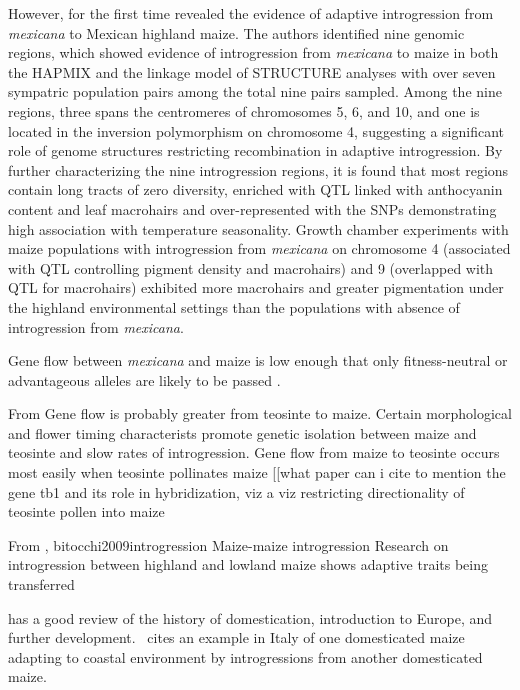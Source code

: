 \documentclass[11pt]{article}
\begin{document}
However, \cite{hufford2013} for the first time revealed the evidence of adaptive introgression from \emph{mexicana} to Mexican highland maize.
The authors identified nine genomic regions, which showed evidence of introgression from \emph{mexicana} to maize in both the HAPMIX and the linkage model of STRUCTURE analyses with over seven sympatric population pairs among the total nine pairs sampled. 
Among the nine regions, three spans the centromeres of chromosomes 5, 6, and 10, and one is located in the inversion polymorphism on chromosome 4, suggesting a significant role of genome structures restricting recombination in adaptive introgression.
By further characterizing the nine introgression regions, it is found that most regions contain long tracts of zero diversity, enriched with QTL linked with anthocyanin content and leaf macrohairs \cite{lauter2004} and over-represented with the SNPs demonstrating high association with temperature seasonality.
Growth chamber experiments with maize populations with introgression from \emph{mexicana} on chromosome 4 (associated with QTL controlling pigment density and macrohairs) and 9 (overlapped with QTL for macrohairs) exhibited more macrohairs and greater pigmentation under the highland environmental settings than the populations with absence of introgression from \emph{mexicana}.

Gene flow between \emph{mexicana} and maize is low enough that only fitness-neutral or advantageous alleles are likely to be passed \cite{slatkin1987gene}.

From \cite{baltazar2005pollination}
Gene flow is probably greater from teosinte to maize.
Certain morphological and flower timing characterists promote genetic isolation between maize and teosinte and slow rates of introgression.
Gene flow from maize to teosinte occurs most easily when teosinte pollinates maize
[[what paper can i cite to mention the gene tb1 and its role in hybridization, viz a viz restricting directionality of teosinte pollen into maize

From \cite{jiang1999genetic}, {bitocchi2009introgression}
Maize-maize introgression
Research on introgression between highland and lowland maize shows adaptive traits being transferred

\cite{bitocchi2009introgression} has a good review of the history of domestication, introduction to Europe, and further development.
\cite{hammer1987collection}\ cites an example in Italy of one domesticated maize adapting to coastal environment by introgressions from another domesticated maize.
\end{document}
